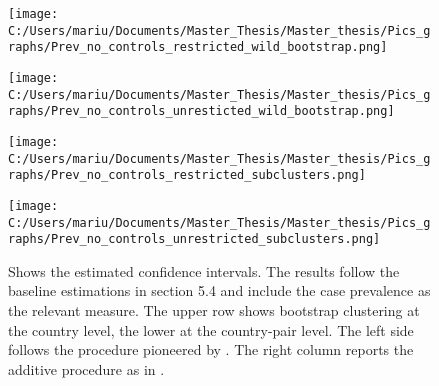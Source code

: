 \documentclass{article}
\begin{document}
\begin{figure}[!ht] 
\begin{minipage}[t]{0.5\linewidth}\vspace{0pt} 
\texttt{[image: C:/Users/mariu/Documents/Master\_Thesis/Master\_thesis/Pics\_graphs/Prev\_no\_controls\_restricted\_wild\_bootstrap.png]}\\
\vspace{2ex}
\end{minipage}\hfill%
\begin{minipage}[t]{0.5\linewidth}\vspace{0pt} 
\texttt{[image: C:/Users/mariu/Documents/Master\_Thesis/Master\_thesis/Pics\_graphs/Prev\_no\_controls\_unresticted\_wild\_bootstrap.png]}\\
\vspace{2ex}
\end{minipage}\hfill%
\begin{minipage}[t]{0.5\linewidth}\vspace{0pt} 
\texttt{[image: C:/Users/mariu/Documents/Master\_Thesis/Master\_thesis/Pics\_graphs/Prev\_no\_controls\_restricted\_subclusters.png]}\\
\vspace{2ex}
\end{minipage}\hfill%
\begin{minipage}[t]{0.5\linewidth}\vspace{0pt} 
\texttt{[image: C:/Users/mariu/Documents/Master\_Thesis/Master\_thesis/Pics\_graphs/Prev\_no\_controls\_unrestricted\_subclusters.png]}\\
\vspace{2ex}
\end{minipage}\hfill%
\caption{Shows the estimated confidence intervals. The results follow the baseline estimations in section 5.4 and include the case prevalence as the relevant measure.
The upper row shows bootstrap clustering at the country level, the lower at the country-pair level. The left side follows the procedure pioneered by \cite{cameron2008bootstrap}. The right column reports the additive procedure as in \cite{mackinnon2018wild}.} 
\label{Wild cluster bootstrap I}
\end{figure}
\end{document}
